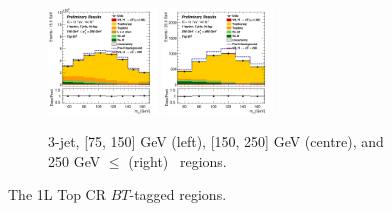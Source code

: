 \begin{figure}[h!]
\begin{subfigure}[b]{\textwidth}
        \includegraphics[width=0.32\textwidth]{Images/VH/Own_fit/postfit_VHcc/Region_distmBB_BMax250_BMin150_DtopCRBC_J3_TTypebt_T1_L1_Y6051_GlobalFit_conditionnal_mu1.png}
        \includegraphics[width=0.32\textwidth]{Images/VH/Own_fit/postfit_VHcc/Region_distmBB_BMax400_BMin250_DtopCRBC_J3_TTypebt_T1_L1_Y6051_GlobalFit_conditionnal_mu1.png}
        \caption{3-jet, [75, 150] GeV (left), [150, 250] GeV (centre), and 250 GeV $\leq$ (right) \ptv\ regions.}
        \label{fig:plots_VHcc_1L_TopCR_3J}
    \end{subfigure}
    \caption{The 1L Top CR $BT$-tagged regions.}
    \label{fig:plots_VHcc_1L_TopCR}
\end{figure}
